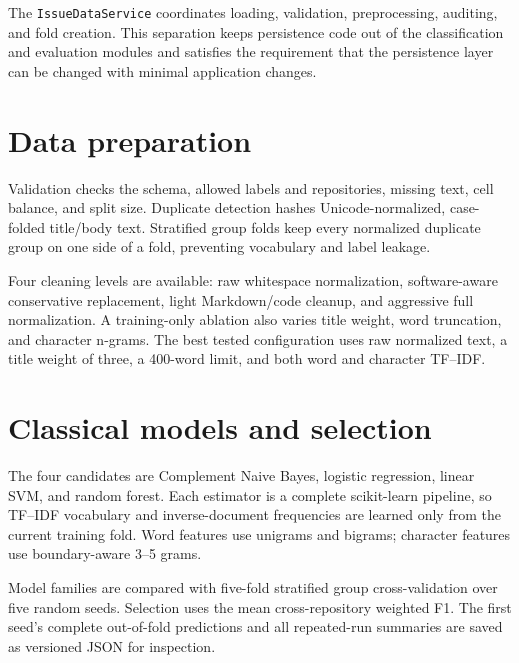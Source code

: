 \documentclass[11pt,a4paper]{article}
\newcommand{\code}[1]{\texttt{#1}}
\begin{document}
The \code{IssueDataService} coordinates loading, validation, preprocessing,
auditing, and fold creation. This separation keeps persistence code out of the
classification and evaluation modules and satisfies the requirement that the
persistence layer can be changed with minimal application changes.

\section{Data preparation}
Validation checks the schema, allowed labels and repositories, missing text,
cell balance, and split size. Duplicate detection hashes Unicode-normalized,
case-folded title/body text. Stratified group folds keep every normalized
duplicate group on one side of a fold, preventing vocabulary and label leakage.

Four cleaning levels are available: raw whitespace normalization,
software-aware conservative replacement, light Markdown/code cleanup, and
aggressive full normalization. A training-only ablation also varies title
weight, word truncation, and character n-grams. The best tested configuration
uses raw normalized text, a title weight of three, a 400-word limit, and both
word and character TF--IDF.

\begin{table}[ht]
\centering
\caption{Top preprocessing configurations on duplicate-safe training folds.}

\end{table}

\section{Classical models and selection}
The four candidates are Complement Naive Bayes, logistic regression, linear
SVM, and random forest. Each estimator is a complete scikit-learn pipeline, so
TF--IDF vocabulary and inverse-document frequencies are learned only from the
current training fold. Word features use unigrams and bigrams; character
features use boundary-aware 3--5 grams.

Model families are compared with five-fold stratified group cross-validation
over five random seeds. Selection uses the mean cross-repository weighted F1.
The first seed's complete out-of-fold predictions and all repeated-run
summaries are saved as versioned JSON for inspection.

\begin{table}[ht]
\centering
\caption{Repeated grouped cross-validation used for model selection.}

\end{table}
\end{document}
